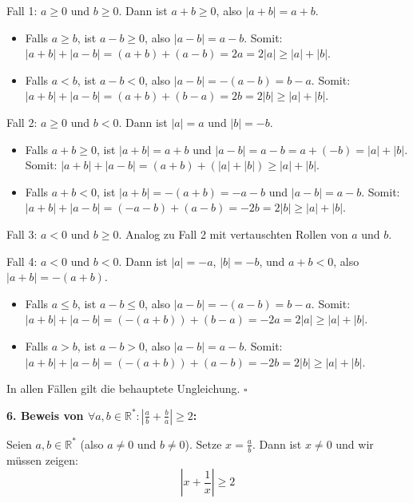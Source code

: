 \documentclass{article}
\newcommand{\abs}[1]{|#1|}
\newcommand{\R}{\mathbb{R}}
\newcommand{\fa}[1]{\forall #1 \colon}
\begin{document}
Fall 1: $a \geq 0$ und $b \geq 0$. 
Dann ist $a + b \geq 0$, also $\abs{a + b} = a + b$.
\begin{itemize}
\item Falls $a \geq b$, ist $a - b \geq 0$, also $\abs{a - b} = a - b$.
Somit: $\abs{a + b} + \abs{a - b} = (a + b) + (a - b) = 2a = 2\abs{a} \geq \abs{a} + \abs{b}$.
\item Falls $a < b$, ist $a - b < 0$, also $\abs{a - b} = -(a - b) = b - a$.
Somit: $\abs{a + b} + \abs{a - b} = (a + b) + (b - a) = 2b = 2\abs{b} \geq \abs{a} + \abs{b}$.
\end{itemize}

Fall 2: $a \geq 0$ und $b < 0$. Dann ist $\abs{a} = a$ und $\abs{b} = -b$.
\begin{itemize}
\item Falls $a + b \geq 0$, ist $\abs{a + b} = a + b$ und $\abs{a - b} = a - b = a + (-b) = \abs{a} + \abs{b}$.
Somit: $\abs{a + b} + \abs{a - b} = (a + b) + (\abs{a} + \abs{b}) \geq \abs{a} + \abs{b}$.
\item Falls $a + b < 0$, ist $\abs{a + b} = -(a + b) = -a - b$ und $\abs{a - b} = a - b$.
Somit: $\abs{a + b} + \abs{a - b} = (-a - b) + (a - b) = -2b = 2\abs{b} \geq \abs{a} + \abs{b}$.
\end{itemize}

Fall 3: $a < 0$ und $b \geq 0$. Analog zu Fall 2 mit vertauschten Rollen von $a$ und $b$.

Fall 4: $a < 0$ und $b < 0$. Dann ist $\abs{a} = -a$, $\abs{b} = -b$, und $a + b < 0$, also $\abs{a + b} = -(a + b)$.
\begin{itemize}
\item Falls $a \leq b$, ist $a - b \leq 0$, also $\abs{a - b} = -(a - b) = b - a$.
Somit: $\abs{a + b} + \abs{a - b} = (-(a + b)) + (b - a) = -2a = 2\abs{a} \geq \abs{a} + \abs{b}$.
\item Falls $a > b$, ist $a - b > 0$, also $\abs{a - b} = a - b$.
Somit: $\abs{a + b} + \abs{a - b} = (-(a + b)) + (a - b) = -2b = 2\abs{b} \geq \abs{a} + \abs{b}$.
\end{itemize}

In allen Fällen gilt die behauptete Ungleichung. $\square$

\textbf{6. Beweis von \(\fa{a,b \in \R^*} \abs{\frac{a}{b} + \frac{b}{a}} \geq 2\):}

Seien $a, b \in \R^*$ (also $a \neq 0$ und $b \neq 0$). Setze $x = \frac{a}{b}$. Dann ist $x \neq 0$ und wir müssen zeigen:
\[\abs{x + \frac{1}{x}} \geq 2\]
\end{document}

